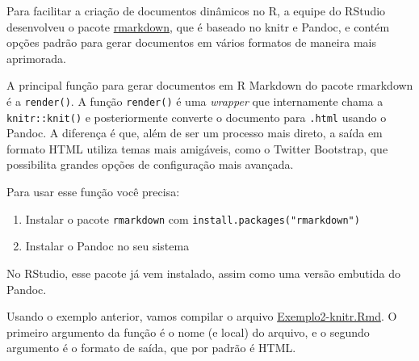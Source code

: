 \documentclass[
  10pt,
  a4paper]{book}
\providecommand{\tightlist}{%
  \setlength{\itemsep}{0pt}\setlength{\parskip}{0pt}}
\begin{document}
Para facilitar a criação de documentos dinâmicos no R, a equipe do
RStudio desenvolveu o pacote \href{http://rmarkdown.rstudio.com}{rmarkdown}, que é baseado no knitr e
Pandoc, e contém opções padrão para gerar documentos em vários formatos
de maneira mais aprimorada.

A principal função para gerar documentos em R Markdown do pacote
rmarkdown é a \texttt{render()}. A função \texttt{render()} é uma \emph{wrapper} que
internamente chama a \texttt{knitr::knit()} e posteriormente converte o
documento para \texttt{.html} usando o Pandoc. A diferença é que, além de ser
um processo mais direto, a saída em formato HTML utiliza temas mais
amigáveis, como o Twitter Bootstrap, que possibilita grandes opções de
configuração mais avançada.

Para usar esse função você precisa:

\begin{enumerate}
\def\labelenumi{\arabic{enumi}.}
\tightlist
\item
  Instalar o pacote \texttt{rmarkdown} com \texttt{install.packages("rmarkdown")}
\item
  Instalar o Pandoc no seu sistema
\end{enumerate}

No RStudio, esse pacote já vem instalado, assim como uma versão embutida
do Pandoc.

Usando o exemplo anterior, vamos compilar o arquivo
\href{exemplos/Exemplo2-knitr.Rmd}{Exemplo2-knitr.Rmd}. O primeiro argumento
da função é o nome (e local) do arquivo, e o segundo argumento é o
formato de saída, que por padrão é HTML.
\end{document}
